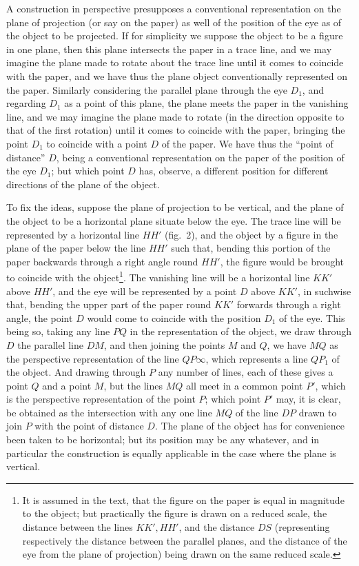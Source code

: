 \documentclass[11pt]{article}
\begin{document}
A construction in perspective presupposes a conventional representation on the plane of
projection (or say on the paper) as well of the position of the eye as of the object
to be projected. If for simplicity we suppose the object to be a figure in one plane,
then this plane intersects the paper in a trace line, and we may imagine the plane
made to rotate about the trace line until it comes to coincide with the paper, and we
have thus the plane object conventionally represented on the paper. Similarly considering
the parallel plane through the eye $D_{1}$, and regarding $D_{1}$ as a point of this
plane, the plane meets the paper in the vanishing line, and we may imagine the plane
made to rotate (in the direction opposite to that of the first rotation) until it
comes to coincide with the paper, bringing the point $D_{1}$ to coincide with a point
$D$ of the paper. We have thus the ``point of distance'' $D$, being a conventional
representation on the paper of the position of the eye $D_{1}$; but which point $D$ has,
observe, a different position for different directions of the plane of the object.

To fix the ideas, suppose the plane of projection to be vertical, and the plane of the
object to be a horizontal plane situate below the eye. The trace line will be
represented by a horizontal line $HH'$ (fig.\ 2), and the object by a figure in the
plane of the paper below the line $HH'$ such that, bending this portion of the paper
backwards through a right angle round $HH'$, the figure would be brought to coincide
with the object\footnote{It is assumed in the text, that the figure on the paper is
equal in magnitude to the object; but practically the figure is drawn on a reduced
scale, the distance between the lines $KK',HH'$, and the distance $DS$ (representing
respectively the distance between the parallel planes, and the distance of the eye
from the plane of projection) being drawn on the same reduced scale.}. The vanishing
line will be a horizontal line $KK'$ above $HH'$, and the eye will be represented by a
point $D$ above $KK'$, in suchwise that, bending the upper part of the paper round
$KK'$ forwards through a right angle, the point $D$ would come to coincide with the
position $D_{1}$ of the eye. This being so, taking any line $PQ$ in the representation
of the object, we draw through $D$ the parallel line $DM$, and then joining the points
$M$ and $Q$, we have $MQ$ as the perspective representation of the line $QP\infty$,
which represents a line $QP_{1}$ of the object. And drawing through $P$ any number of
lines, each of these gives a point $Q$ and a point $M$, but the lines $MQ$ all meet in
a common point $P'$, which is the perspective representation of the point $P$; which
point $P'$ may, it is clear, be obtained as the intersection with any one line $MQ$ of
the line $DP$ drawn to join $P$ with the point of distance $D$. The plane of the
object has for convenience been taken to be horizontal; but its position may be any
whatever, and in particular the construction is equally applicable in the case where
the plane is vertical.
\end{document}
